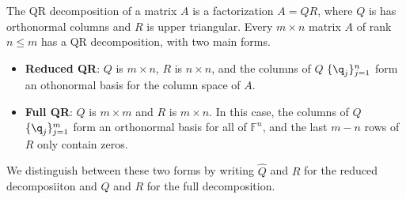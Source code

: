 \label{lab:QRdecomp}
\def\lvl#1{\multicolumn{1}{|c}{#1}} %
\def\rvl#1{\multicolumn{1}{c|}{#1}} %

The QR decomposition of a matrix $A$ is a factorization $A=QR$, where $Q$ is  has orthonormal columns and $R$ is upper triangular.
Every $m \times n$ matrix $A$ of rank $n \le m$ has a QR decomposition, with two main forms.
%
\begin{itemize}
    \item \textbf{Reduced QR}: $Q$ is $m \times n$, $R$ is $n \times n$, and the columns of $Q$ $\{\q_j\}_{j=1}^n$ form an othonormal basis for the column space of $A$.
    \item \textbf{Full QR}: $Q$ is $m \times m$ and $R$ is $m \times n$.
    In this case, the columns of $Q$ $\{\q_j\}_{j=1}^m$ form an orthonormal basis for all of $\mathbb{F}^n$, and the last $m - n$ rows of $R$ only contain zeros.
\end{itemize}
We distinguish between these two forms by writing $\widehat{Q}$ and $\widehat{R}$ for the reduced decomposiiton and $Q$ and $R$ for the full decomposition.
%
